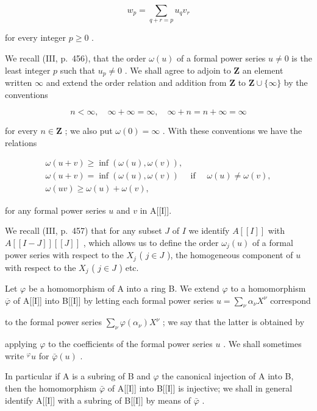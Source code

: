 \[
w _ {p} = \sum_ {q + r = p} u _ {q} v _ {r}\tag{1}
\]

for every integer \(p \geqslant 0\) .

We recall (III, p.~456), that the order \(\omega(u)\) of a formal power series \(u \neq 0\) is the least integer \(p\) such that \(u_p \neq 0\) . We shall agree to adjoin to \(\mathbf{Z}\) an element written \(\infty\) and extend the order relation and addition from \(\mathbf{Z}\) to \(\mathbf{Z} \cup \{\infty\}\) by the conventions

\[
n <   \infty , \quad \infty + \infty = \infty , \quad \infty + n = n + \infty = \infty
\]

for every \(n \in \mathbf{Z}\) ; we also put \(\omega(0) = \infty\) . With these conventions we have the relations

\[
\begin{array}{c} \omega (u + v) \geqslant \inf (\omega (u), \omega (v)), \\ \omega (u + v) = \inf (\omega (u), \omega (v)) \quad \text { if } \quad \omega (u) \neq \omega (v), \\ \omega (u v) \geqslant \omega (u) + \omega (v), \end{array}
\]

for any formal power series \(u\) and \(v\) in A{[}{[}I{]}{]}.

We recall (III, p.~457) that for any subset \(J\) of \(I\) we identify \(A[[I]]\) with \(A[[I - J]][[J]]\) , which allows us to define the order \(\omega_{j}(u)\) of a formal power series with respect to the \(X_{j}\) ( \(j \in J\) ), the homogeneous component of \(u\) with respect to the \(X_{j}\) ( \(j \in J\) ) etc.

Let \(\varphi\) be a homomorphism of A into a ring B. We extend \(\varphi\) to a homomorphism \(\overline{\varphi}\) of A{[}{[}I{]}{]} into B{[}{[}I{]}{]} by letting each formal power series \(u = \sum_{\nu} \alpha_{\nu} X^{\nu}\) correspond

to the formal power series \(\sum_{\nu} \varphi(\alpha_{\nu}) X^{\nu}\) ; we say that the latter is obtained by

applying \(\varphi\) to the coefficients of the formal power series \(u\) . We shall sometimes write \({}^{\varphi}u\) for \(\bar{\varphi}(u)\) .

In particular if A is a subring of B and \(\varphi\) the canonical injection of A into B, then the homomorphism \(\bar{\varphi}\) of A{[}{[}I{]}{]} into B{[}{[}I{]}{]} is injective; we shall in general identify A{[}{[}I{]}{]} with a subring of B{[}{[}I{]}{]} by means of \(\bar{\varphi}\) .

